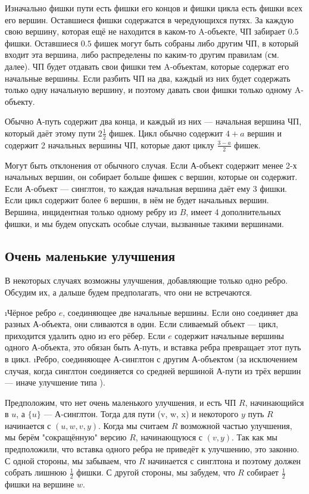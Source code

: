 \begin{proofstar}
Изначально фишки пути есть фишки его концов и фишки цикла есть фишки всех его вершин. Оставшиеся фишки содержатся в чередующихся путях. За каждую свою вершину, которая ещё не находится в каком-то A-объекте, ЧП забирает $0.5$ фишки. Оставшиеся $0.5$ фишек могут быть собраны либо другим ЧП, в который входит эта вершина, либо распределены по каким-то другим правилам (см. далее). ЧП будет отдавать свои фишки тем A-объектам, которые содержат его начальные вершины. Если разбить ЧП на два, каждый из них будет содержать только одну начальную вершину, и поэтому давать свои фишки только одному A-объекту.

Обычно А-путь содержит два конца, и каждый из них --- начальная вершина ЧП, который даёт этому пути $2 \frac{1}{2}$ фишек. Цикл обычно содержит $4+a$ вершин и содержит 2 начальных вершины ЧП, которые дают циклу $\frac{3-a}{2}$ фишек.

Могут быть отклонения от обычного случая. Если А-объект содержит менее 2-х начальных вершин, он собирает больше фишек с вершин, которые он содержит. Если А-объект --- синглтон, то каждая начальная вершина даёт ему 3 фишки. Если цикл содержит более 6 вершин, в нём не будет начальных вершин. Вершина, инцидентная только одному ребру из $B$, имеет 4 дополнительных фишки, и мы будем опускать особые случаи, вызванные такими вершинами.

\subsection{Очень маленькие улучшения}
В некоторых случаях возможны улучшения, добавляющие только одно ребро. Обсудим их, а дальше будем предполагать, что они не встречаются.

\begin{itemize}
\i Чёрное ребро $e$, соединяющее две начальные вершины. Если оно соединяет два разных А-объекта, они сливаются в один. Если сливаемый объект --- цикл, приходится удалить одно из его рёбер. Если $e$ содержит начальные вершины одного А-объекта, это обязан быть А-путь, и вставка ребра превращает этот путь в цикл.
\i Ребро, соединяющее А-синглтон с другим А-объектом (за исключением случая, когда синглтон соединяется со средней вершиной А-пути из трёх вершин --- иначе улучшение типа ).
\end{itemize}

Предположим, что нет очень маленького улучшения, и есть ЧП $R$, начинающийся в $u$, а $\{u\}$ --- А-синглтон. Тогда для пути (v, w, x) и некоторого $y$ путь $R$ начинается с $(u, w, v, y)$. Когда мы считаем $R$ возможной частью улучшения, мы берём "сокращённую" версию $R$, начинающуюся с $(v, y)$. Так как мы предположили, что вставка одного ребра не приведёт к улучшению, это законно. С одной стороны, мы забываем, что $R$ начинается с синглтона и поэтому должен собрать лишнюю $\frac{1}{2}$ фишки. С другой стороны, мы забудем, что $R$ собирает $\frac{1}{2}$ фишки на вершине $w$.


\end{proofstar}
